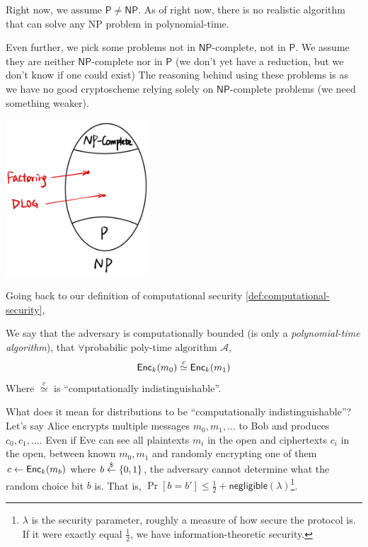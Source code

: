 Right now, we assume $\mathsf{P}\neq\mathsf{NP}$. As of right now, there is no realistic algorithm that can solve any \textsf{NP} problem in polynomial-time.

Even further, we pick some problems not in $\mathsf{NP}$-complete, not in $\mathsf{P}$. We assume they are neither $\mathsf{NP}$-complete nor in $\mathsf{P}$ (we don't yet have a reduction, but we don't know if one could exist) The reasoning behind using these problems is as we have no good cryptoscheme relying solely on $\mathsf{NP}$-complete problems (we need something weaker).

\begin{center}
    \includegraphics[width=0.4\textwidth]{images/2023-01-31/pnp-venn.png}
\end{center}

Going back to our definition of computational security \cref{def:computational-security},
\begin{definition*}
    We say that the adversary is computationally bounded (is only a \emph{ polynomial-time algorithm}), that $\forall \text{probabilic poly-time algorithm }\mathcal{A}$,
    \[\operatorname{\mathsf{Enc}}_k(m_0)\overset{c}{\simeq}\operatorname{\mathsf{Enc}}_k(m_1)\]
    Where $\overset{c}{\simeq}$ is ``computationally indistinguishable''.
\end{definition*}

What does it mean for distributions to be ``computationally indistinguishable''? Let's say Alice encrypts multiple messages $m_0, m_1, \dots$ to Bob and produces $c_0, c_1, \dots$. Even if Eve can see all plaintexts $m_i$ in the open and ciphertexts $c_i$ in the open, between known $m_0, m_1$ and randomly encrypting one of them $c\leftarrow \operatorname{\mathsf{Enc}}_{k}(m_b)$ where $b\overset{\$}{\leftarrow} \{0, 1\}$, the adversary cannot determine what the random choice bit $b$ is. That is, $\Pr[b = b'] \leq \frac{1}{2} + \mathsf{negligible}(\lambda)$\footnote{$\lambda$ is the security parameter, roughly a measure of how secure the protocol is. If it were exactly equal $\frac{1}{2}$, we have information-theoretic security.}.

